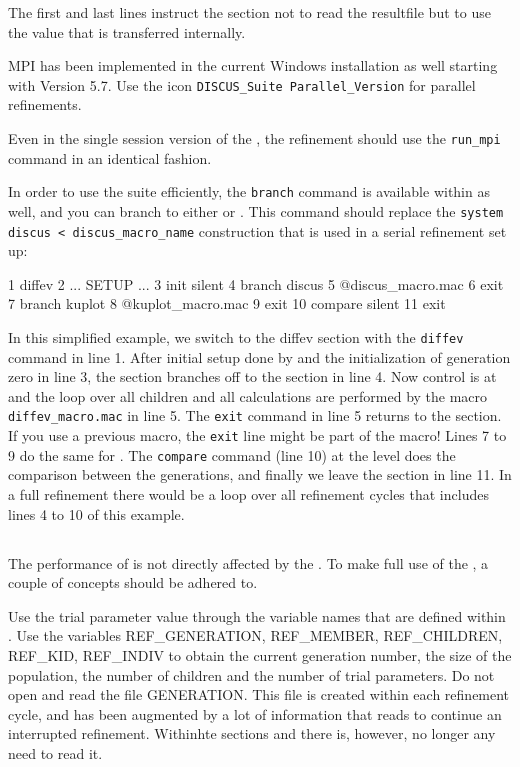 The first and last lines instruct the \Diffev section not to read the 
resultfile but to use the value that is transferred internally.

MPI has been implemented in the current Windows installation as well
starting with Version 5.7.
Use the icon {\tt DISCUS\_Suite Parallel\_Version} for parallel 
refinements. 

Even in the single session version of  the \suite, the refinement
should use the {\tt run\_mpi} command in an identical fashion.

In order to use the suite efficiently, the 
{\tt branch} command is available within \diffev as well, and you
can branch to either \discus or \Kuplot. This command should replace the 
{\tt system discus < discus\_macro\_name} construction that is used in a
serial refinement set up:


\begin{MacVerbatim}
   1  diffev
   2     ... SETUP ...
   3     init silent
   4     branch discus
   5        @discus_macro.mac
   6        exit
   7     branch kuplot
   8        @kuplot_macro.mac
   9        exit
  10     compare silent
  11  exit
\end{MacVerbatim}

In this simplified example, we switch to the diffev section with 
the {\tt diffev} command in line 1. After initial setup done by 
\Diffev and the initialization of generation zero in line 3, 
the \Diffev section branches off to the \Discus section in line 4.
Now control is at \Discus and the loop over all children and all
calculations are performed by the macro {\tt diffev\_macro.mac} in 
line 5. The {\tt exit} command in line 5 returns to the \Diffev section. 
If you use a previous \Discus macro, the {\tt exit} line might 
be part of the \Discus macro! Lines 7 to 9 do the same for 
\kuplot. The {\tt compare} command (line 10) at the \Diffev level does 
the comparison between the generations, and finally we leave the 
\Diffev section in line 11. In a full refinement there would be a loop 
over all refinement cycles that includes lines 4 to 10 of this example.

\subsection{\discus}

The performance of \Discus is not directly affected by the \suite. To make 
full use of the \suite, a couple of concepts should be adhered to.

Use the trial parameter value through the variable names that are defined
within \Diffev. 
Use the variables
REF\_GENERATION, REF\_MEMBER, REF\_CHILDREN, REF\_KID, REF\_INDIV 
to obtain the current
generation number, the size of the population, the number of children 
and the number of trial parameters.  Do not open and read the file GENERATION.
This file is created within each refinement cycle, and has been augmented 
by a lot of information that \Diffev reads to continue an interrupted refinement.
Withinhte sections \Discus and \Kuplot there is, however, 
no longer any need to read it.


